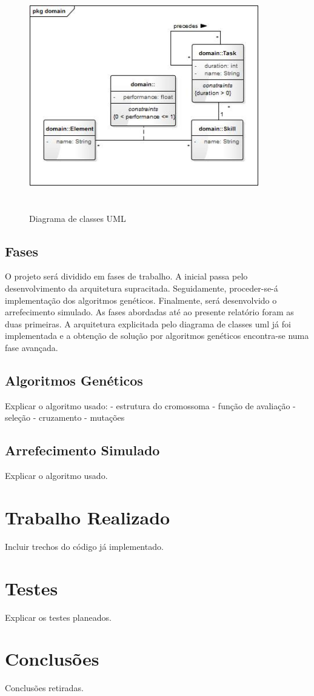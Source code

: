 \begin{titlepage}
\begin{figure}[h]
  \centering
    \includegraphics[width=10cm, height = 10cm]{uml.jpg}
  \caption{Diagrama de classes UML}
  \label{fig:uml}
\end{figure}

\subsection{Fases}
\justify\normalsize 
O projeto será dividido em fases de trabalho. A inicial passa pelo desenvolvimento da arquitetura supracitada. Seguidamente, proceder-se-á implementação dos  algoritmos genéticos. Finalmente, será desenvolvido o arrefecimento simulado. As fases abordadas até ao presente relatório foram as duas primeiras. A arquitetura explicitada pelo diagrama de classes uml já foi implementada e a obtenção de solução por algoritmos genéticos encontra-se numa fase avançada.

\subsection{Algoritmos Genéticos}
\justify\normalsize
Explicar o algoritmo usado:
	- estrutura do cromossoma
	- função de avaliação
	- seleção
	- cruzamento
	- mutações

\subsection{Arrefecimento Simulado}
\justify\normalsize
Explicar o algoritmo usado.

\section{Trabalho Realizado}
\justify\normalsize
Incluir trechos do código já implementado.

\section{Testes}
\justify\normalsize
Explicar os testes planeados.

\section{Conclusões}
\justify\normalsize
Conclusões retiradas.

\printindex

\end{titlepage}

